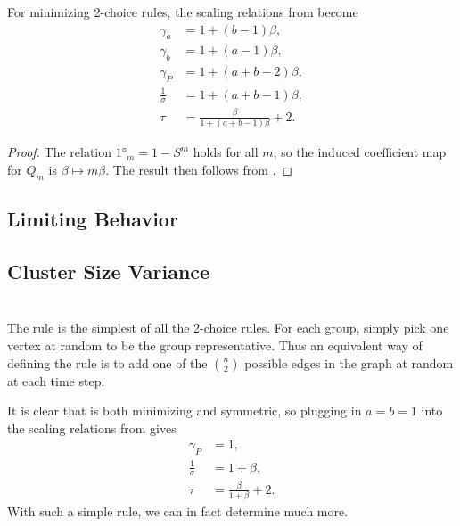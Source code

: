 \documentclass[twoside,10pt]{article}
\begin{document}
\begin{cor}
	\label{2c-minimizing-scaling-relations}
	For minimizing 2-choice rules, the scaling relations from  become
\begin{align*}
        \gamma_{a} &= 1 + (b-1)\beta,\\
        \gamma_{b} &= 1+(a-1)\beta,\\
        \gamma_{P} &= 1+(a+b-2)\beta,\\
        \frac{1}{\sigma} &= 1+(a+b-1)\beta,\\
        \tau &= \frac{\beta}{1+(a+b-1)\beta} +2.
\end{align*}
\end{cor}
\begin{proof}
	The relation $\ang{1}_{m} = 1 - S^{m}$ holds for all $m$, so the induced coefficient map for $Q_{m}$ is $\beta \mapsto m \beta$. The result then follows from .
\end{proof}


\subsection{Limiting Behavior}

\subsection{Cluster Size Variance}

\section{\ER}

The \ER rule is the simplest of all the 2-choice rules. For each group, simply pick one vertex at random to be the group representative. Thus an equivalent way of defining the \ER rule is to add one of the $\binom{n}{2}$ possible edges in the graph at random at each time step.

It is clear that \ER is both minimizing and symmetric, so plugging in $a=b=1$ into the scaling relations from  gives
\begin{align*}
        \gamma_{P} &= 1,\\
        \frac{1}{\sigma} &= 1 + \beta,\\
        \tau &= \frac{\beta}{1+\beta} +2.
\end{align*}
With such a simple rule, we can in fact determine much more.
\end{document}
